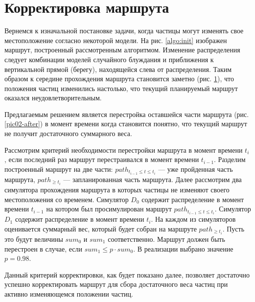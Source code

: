 \section{Корректировка маршрута}
\begin{figure}[ht]
  \centering
\begin{minipage}[t]{.4\textwidth}
  \centering
  \label{algo:init}
\end{minipage}
\begin{minipage}[t]{.4\textwidth}
  \centering
  \label{algo:before}
\end{minipage}
\end{figure}

Вернемся к изначальной постановке задачи, когда частицы могут изменять свое местоположение
согласно некоторой модели. На рис. \ref{algo:init} изображен маршрут, построенный
рассмотренным алгоритмом. Изменение распределения следует комбинации моделей случайного
блуждания и приближения к вертикальной прямой (берегу), находящейся слева от распределения.
Таким образом к середине прохождения маршрута становится заметно (рис. \ref{algo:before}), что
положения частиц изменились настолько, что текущий планируемый маршрут оказался неудовлетворительным.

Предлагаемым решением является перестройка оставшейся части маршрута (рис. \ref{pic02-after})
в момент времени когда становится понятно, что текущий маршрут не получит достаточного
суммарного веса.


Рассмотрим критерий необходимости перестройки маршрута в момент времени $t_i$, если последний
раз маршрут перестраивался в момент времени $t_{i-1}$. Разделим построенный
маршрут на две части: $path_{t_{i-1} \le t \le t_{i}}$ --- уже пройденная часть маршрута, $path_{\ge t_{i}}$
--- запланированная часть маршрута. Далее рассмотрим два симулятора прохождения маршрута в которых
частицы не изменяют своего местоположения со временем. Симулятор $D_0$ содержит распределение
в момент времени $t_{i-1}$ на котором был просимулирован маршрут $path_{t_{i-1} \le t \le t_{i}}$.
Симулятор $D_1$ содержит распределение в момент времени $t_i$. На каждом из симуляторов оценивается
суммарный вес, который будет собран на маршруте $path_{\ge t_{i}}$. Пусть это будут величины
$sum_0$ и $sum_1$ соответственно. Маршрут должен быть перестроен в случае, если
 $sum_1 \le p \cdot sum_0$. В реализации выбрано значение $p = 0.98$.

Данный критерий корректировки, как будет показано далее, позволяет достаточно успешно корректировать
маршрут для сбора достаточного веса частиц при активно изменяющемся положении частиц.

\FloatBarrier

